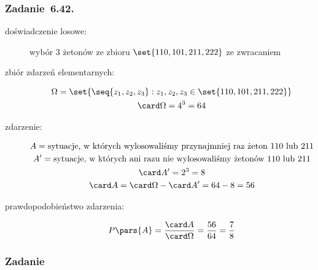 \subsubsection*{Zadanie~6.42.}
\begin{description}
    \item[doświadczenie losowe:] wybór \(3\) żetonów ze zbioru \(\set{110, 101, 211, 222}\) ze zwracaniem
    \item[zbiór zdarzeń elementarnych:]
        \begin{gather*}
            \Omega = \set{\seq{z_1, z_2, z_3} : z_1, z_2, z_3 \in \set{110, 101, 211, 222}}\\
            \card\Omega = 4^3 = 64
        \end{gather*}
    \item[zdarzenie:]
        \begin{gather*}
            A = \text{sytuacje, w~których wylosowaliśmy przynajmniej raz żeton \(110\) lub \(211\)}\\
            A' = \text{sytuacje, w~których ani razu nie wylosowaliśmy żetonów \(110\) lub \(211\)}\\
            \card A' = 2^3 = 8\\
            \card A = \card\Omega - \card A' = 64 - 8 = 56
        \end{gather*}
    \item[prawdopodobieństwo zdarzenia:]
        \begin{gather*}
            P\pars{A}
                = \frac{\card A}{\card\Omega}
                = \frac{56}{64}
                = \frac{7}{8}
        \end{gather*}
\end{description}
\subsubsection*{Zadanie~}